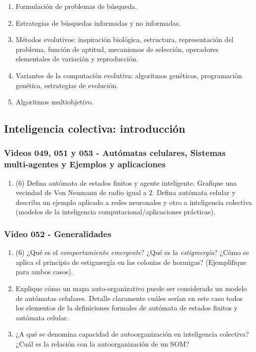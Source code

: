 \documentclass[a4paper,10pt,spanish]{article}
\begin{document}
\begin{enumerate}
\item Formulación de problemas de búsqueda.
\item Estrategias de búsquedas informadas y no informadas.
\item Métodos evolutivos: inspiración biológica, estructura, representación del problema, función de aptitud, mecanismos de selección, operadores elementales de variación y reproducción.
\item Variantes de la computación evolutiva: algoritmos genéticos, programación genética, estrategias de evolución.
\item Algoritmos multiobjetivo.
\end{enumerate}

\subsection{Inteligencia colectiva: introducción}

\subsubsection{Videos 049, 051 y 053 - Autómatas celulares, Sistemas multi-agentes y Ejemplos y aplicaciones}

\begin{enumerate}
\item (6) Defina autómata de estados finitos y agente inteligente. Grafique una vecindad de Von Neumann de radio igual a 2. Defina autómata celular y describa un ejemplo aplicado a redes neuronales y otro a inteligencia colectiva (modelos de la inteligencia computacional/aplicaciones prácticas).
\end{enumerate}

\subsubsection{Video 052 - Generalidades}

\begin{enumerate}
\item (6) ¿Qué es el \textit{comportamiento emergente}? ¿Qué es la \textit{estigmergía}? ¿Cómo se aplica el principio de estigmergía en las colonias de hormigas? (Ejemplifique para ambos casos).

\item Explique cómo un mapa auto-organizativo puede ser considerado un modelo de autómatas celulares. Detalle claramente cuáles serían en este caso todos los elementos de la definiciones formales de autómata de estados finitos y autómata celular.

\item ¿A qué se denomina capacidad de autoorganización en inteligencia colectiva? ¿Cuál es la relación con la autoorganización de un SOM?
\end{enumerate}
\end{document}

